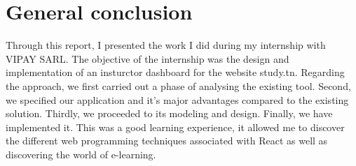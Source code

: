 \section*{General conclusion}
Through this report, I presented the work I did during my internship with
VIPAY SARL. The objective of the internship was the design and implementation of an insturctor dashboard for the website study.tn.
\hfill \break
Regarding the approach, we first carried out a phase of analysing the existing tool. Second, we specified our application and it's major advantages compared to the existing solution. Thirdly, we proceeded to its modeling and design. Finally, we have implemented it.
\hfill \break
This was a good learning experience, it allowed me to discover the different
web programming techniques associated with React as well as discovering the world of e-learning.